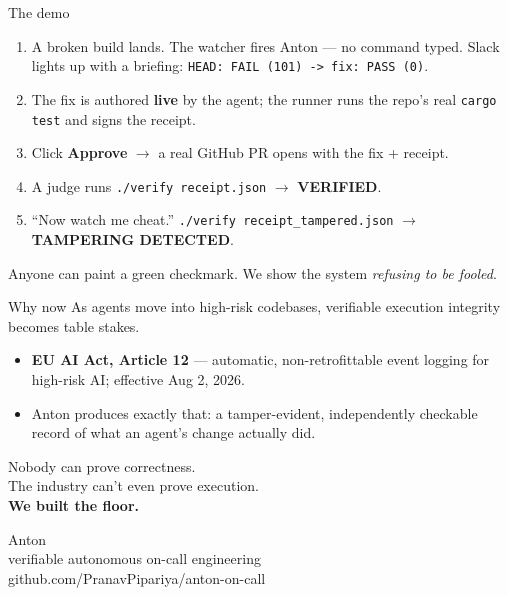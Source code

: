 \documentclass[aspectratio=169,11pt]{beamer}
\begin{document}
\begin{frame}{The demo}
  \begin{enumerate}
    \item A broken build lands. The watcher fires Anton --- \alert{no command typed}.
          Slack lights up with a briefing: \texttt{HEAD: FAIL (101) -> fix: PASS (0)}.
    \item The fix is authored \textbf{live} by the agent; the runner runs the repo's
          real \texttt{cargo test} and signs the receipt.
    \item Click \textbf{Approve} $\to$ a real GitHub PR opens with the fix + receipt.
    \item A judge runs \texttt{./verify receipt.json} $\to$ \textcolor{good}{\textbf{VERIFIED}}.
    \item ``Now watch me cheat.'' \texttt{./verify receipt\_tampered.json} $\to$
          \textcolor{bad}{\textbf{TAMPERING DETECTED}}.
  \end{enumerate}
  \vspace{0.5em}
  \begin{center}\small
    Anyone can paint a green checkmark. We show the system \emph{refusing to be fooled}.
  \end{center}
\end{frame}

\begin{frame}{Why now}
  As agents move into high-risk codebases, verifiable execution integrity becomes
  table stakes.
  \vspace{0.5em}
  \begin{itemize}
    \item \textbf{EU AI Act, Article 12} --- automatic, non-retrofittable event logging
          for high-risk AI; effective Aug 2, 2026.
    \item Anton produces exactly that: a tamper-evident, independently checkable record
          of what an agent's change actually did.
  \end{itemize}
  \vspace{1em}
  \begin{center}
    \Large Nobody can prove correctness.\\
    The industry can't even prove execution.\\[0.4em]
    \alert{\textbf{We built the floor.}}
  \end{center}
\end{frame}

\begin{frame}[standout]
  Anton\\[0.3em]
  {\normalsize verifiable autonomous on-call engineering}\\[1em]
  {\footnotesize github.com/PranavPipariya/anton-on-call}
\end{frame}
\end{document}
